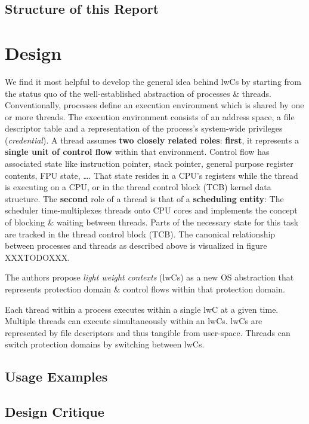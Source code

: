 \documentclass[10pt,twocolumn,letter]{article}
\begin{document}
\subsection{Structure of this Report}
\blindtext


\section{Design}\label{design}
We find it most helpful to develop the general idea behind lwCs by starting from the status quo of the well-established abstraction of processes \& threads.
Conventionally, processes define an execution environment which is shared by one or more threads.
The execution environment consists of an address space, a file descriptor table and a representation of the process's system-wide privileges (\textit{credential}).
A thread assumes \textbf{two closely related roles}:
\textbf{first}, it represents a \textbf{single unit of control flow} within that environment.
Control flow has associated state like instruction pointer, stack pointer, general purpose register contents, FPU state, \dots.
That state resides in a CPU's registers while the thread is executing on a CPU, or in the thread control block (TCB) kernel data structure.
The \textbf{second} role of a thread is that of a \textbf{scheduling entity}:
The scheduler time-multiplexes threads onto CPU cores and implements the concept of blocking \& waiting between threads.
Parts of the necessary state for this task are tracked in the thread control block (TCB).
The canonical relationship between processes and threads as described above is visualized in figure XXXTODOXXX.

The authors propose \textit{light weight contexts} (lwCs) as a new OS abstraction that represents protection domain \& control flows within that protection domain.

Each thread within a process executes within a single lwC at a given time.
Multiple threads can execute simultaneously within an lwCs.
lwCs are represented by file descriptors and thus tangible from user-space.
Threads can switch protection domains by switching between lwCs.



\subsection{Usage Examples}\label{usage}
\subsection{Design Critique}\label{dsgn:crit}
\end{document}

